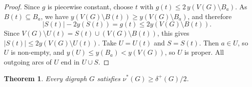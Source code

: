 \documentclass[10pt,a4paper]{article}
\newtheorem{theorem}{Theorem}[section]
\numberwithin{equation}{section}
\begin{document}
\begin{proof}
Since $g$ is piecewise constant, choose $t$ with
$g(t)\le 2\,y(V(G)\setminus B_a)$. As $B(t)\subseteq B_a$, we have
$y(V(G)\setminus B(t))\ge y(V(G)\setminus B_a)$, and therefore
$$
|S(t)|-2y(S(t))=g(t)\le 2y(V(G)\setminus B(t)).
$$
Since $V(G)\setminus U(t)=S(t)\cup(V(G)\setminus B(t))$, this gives $
|S(t)|\le 2y(V(G)\setminus U(t))$. Take $U=U(t)$ and $S=S(t)$. Then $a\in U$, so $U$ is non-empty, and
$y(U)\le y(B_a)<y(V(G))$, so $U$ is proper. All outgoing arcs of $U$
end in $U\cup S$.
\end{proof}




\begin{theorem}\label{thm:fractional}
Every digraph $G$ satisfies $\nu^\ast(G)\ge\delta^+(G)/2$.
\end{theorem}
\end{document}
